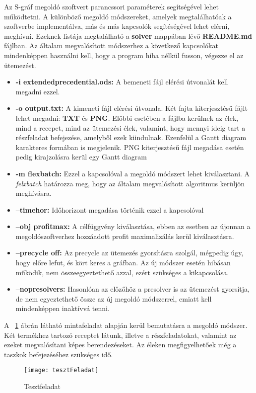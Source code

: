 Az S-gráf megoldó szoftvert parancssori paraméterek segítségével lehet működtetni. A különböző megoldó módszereket, amelyek megtalálhatóak a szoftverbe implementálva, más és más kapcsolók segítéségével lehet elérni, meghívni. Ezeknek listája megtalálható a \textbf{solver} mappában lévő \textbf{README.md} fájlban. Az általam megvalósított módszerhez a következő kapcsolókat mindenképpen használni kell, hogy a program hiba nélkül fusson, végezze el az ütemezést.
\begin{itemize}
	\item \textbf{-i extended\textunderscore precedential.ods:} A bemeneti fájl elérési útvonalát kell megadni ezzel.
	\item \textbf{-o output.txt:} A kimeneti fájl elérési útvonala. Két fajta kiterjesztésű fájlt lehet megadni: \textbf{TXT} és \textbf{PNG}. Előbbi esetében a fájlba kerülnek az élek, mind a recepet, mind az ütemezési élek, valamint, hogy mennyi ideig tart a részfeladat befejezése, amelyből ezek kiindulnak. Ezenfelül a Gantt diagram karakteres formában is megjelenik. PNG kiterjesztésű fájl megadása esetén pedig kirajzolásra kerül egy Gantt diagram
	\item \textbf{-m flexbatch:} Ezzel a kapcsolóval a megoldó módszert lehet kiválasztani. A \textit{felxbatch} határozza meg, hogy az általam megvalósított algoritmus kerüljön meghívásra.
	\item \textbf{--timehor:} Időhorizont megadása történik ezzel a kapcsolóval
	\item \textbf{--obj profit\textunderscore max:} A célfüggvény kiválasztása, ebben az esetben az újonnan a megoldószoftverhez hozzáadott profit maximalizálás kerül kiválasztásra.
	\item \textbf{--precycle off:} Az precycle az ütemezés gyorsításra szolgál, mégpedig úgy, hogy előre lefut, és kört keres a gráfban. Az új módszer esetén hibásan működik, nem összeegyeztethető azzal, ezért szükséges a kikapcsolása.
	\item \textbf{--nopresolvers:} Hasonlóan az előzőhöz a presolver is az ütemezést gyorsítja, de nem egyeztethető össze az új megoldó módszerrel, emiatt kell mindenképpen inaktívvá tenni.
\end{itemize}

A ~\ref{tesztFeladat} ábrán látható mintafeladat alapján kerül bemutatásra a megoldó módszer. Két termékhez tartozó receptet látunk, illetve a részfeladatokat, valamint az ezeket megvalósítani képes berendezéseket. Az éleken megfigyelhetőek még a taszkok befejezéséhez szükséges idő.
\begin{figure}[H]
\begin{center}
\texttt{[image: tesztFeladat]}
\caption{Tesztfeladat}
\label{tesztFeladat}
\end{center}
\end{figure}


